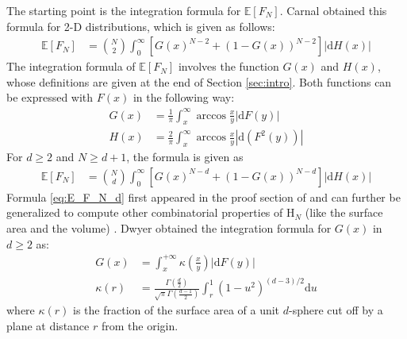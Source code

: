\documentclass[conference,a4paper]{IEEEtran}
\def\E{\mathbb{E}}
\begin{document}
The starting point is the integration formula for $\E[F_N]$.
Carnal \cite{carnal1970konvexe}
obtained
this formula for 2-D distributions,
which is given as follows:
\begin{align}
     \E[F_N] &= \binom{N}{2} \int_0^{\infty} 
     \left[G(x)^{N-2} + (1-G(x))^{N-2} \right]|\mathrm{d} H(x)| 
     \label{eq:E_F_N_2_d}
\end{align}
The integration formula of $\E[F_N]$ involves the function $G(x)$ and $H(x)$,
whose definitions are given at the end of Section \ref{sec:intro}.
Both functions can be expressed with $F(x)$ in the following way:
\begin{align}
   G(x) &=\frac{1}{\pi} \int_x^{\infty}\arccos\frac{x}{y} |\mathrm{d} F(y)| \\
     H(x) &= \frac{2}{\pi} \int_x^{\infty} \arccos \frac{x}{y} |\mathrm{d}(F^2(y))|
     \label{eq:H_expression_2_dim}
\end{align}
For $d\geq 2$ and $N\geq d+1$, the formula is given as
\begin{align}
     \E[F_N] &= \binom{N}{d} \int_0^{\infty} 
     \left[G(x)^{N-d} + (1-G(x))^{N-d} \right]|\mathrm{d} H(x)| 
    \label{eq:E_F_N_d}
\end{align}
Formula \eqref{eq:E_F_N_d} first appeared in the proof section of \cite{raynaud1970enveloppe}
and can further be generalized to compute other combinatorial properties of $\mathrm{H}_N$ (like the surface area and the volume)
\cite{barany2008random}.
Dwyer obtained the integration formula for $G(x)$ in $d\geq 2$ as:
\begin{align}\label{eq:G_d_kappa}
     G(x) & = \int_x^{+\infty} \kappa \left(\frac{x}{y} \right) |\mathrm{d}F(y)| \\
     \kappa(r) & = \frac{\Gamma(\frac{d}{2})}
     {\sqrt{\pi}\Gamma(\frac{d-1}{2})}\int_r^{1}
     (1-u^2)^{(d-3)/2}\mathrm{d}u\label{eq:kappa_r}
\end{align}
where $\kappa(r)$ is the fraction of the surface area of a unit $d$-sphere
cut off by a plane at distance $r$ from the origin.
\end{document}
